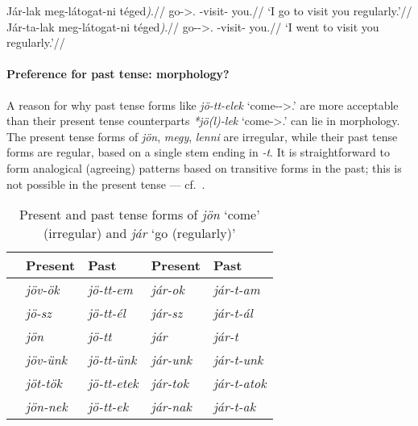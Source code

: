 \pex
    \a
    \begingl
        \gla 	Jár-lak meg-látogat-ni \nogloss{(}téged\emph{)}.//
        \glb 	go-\Fsg>\Second.\Obj{} \Vm-visit-\Inf{} you.\Acc//
        \glft 	\enquote*{I go to visit you regularly.}//
    \endgl
    \a
    \begingl
        \gla 	Jár-ta-lak meg-látogat-ni \nogloss{(}téged\emph{)}.//
        \glb 	go-\Pst-\Fsg>\Second.\Obj{} \Vm-visit-\Inf{} you.\Acc//
        \glft 	\enquote*{I went to visit you regularly.}//
    \endgl
\xe

\paragraph{Preference for past tense: morphology?}

A reason for why past tense forms like \emph{jö-tt-elek}
\enquote*{come-\Pst-\Fsg>\Second.\Obj} are more acceptable than their present
tense counterparts \emph{*jö(l)-lek} \enquote*{come-\Fsg>\Second.\Obj} can lie
in morphology. The present tense forms of \emph{jön}, \emph{megy}, \emph{lenni}
are irregular, while their past tense forms are regular, based on a single stem
ending in \emph{-t}.  It is straightforward to form analogical (agreeing)
patterns based on transitive forms in the past; this is not possible in the
present tense --- cf.~.

\begin{table}[h!]%
    \centering
    \begin{tabular}{lllll}
    \toprule
              & Present        & Past              & Present       & Past \\
    \midrule
    \Fsg{} & \emph{jöv-ök}  & \emph{jö-tt-em}   & \emph{jár-ok}  & \emph{jár-t-am} \\
    \Ssg{} & \emph{jö-sz}   & \emph{jö-tt-él}   & \emph{jár-sz}  & \emph{jár-t-ál} \\
    \Tsg{} & \emph{jön}     & \emph{jö-tt}      & \emph{jár}     & \emph{jár-t} \\
    \Fpl{} & \emph{jöv-ünk} & \emph{jö-tt-ünk}  & \emph{jár-unk} & \emph{jár-t-unk} \\
    \Spl{} & \emph{jöt-tök} & \emph{jö-tt-etek} & \emph{jár-tok} & \emph{jár-t-atok} \\
    \Tpl{} & \emph{jön-nek} & \emph{jö-tt-ek}   & \emph{jár-nak} & \emph{jár-t-ak} \\
    \bottomrule
    \end{tabular}
    \caption{Present and past tense forms of \emph{jön} \enquote*{come}
    (irregular) and \emph{jár} \enquote*{go (regularly)}}\label{tb:jon-prs-pst}
\end{table}

